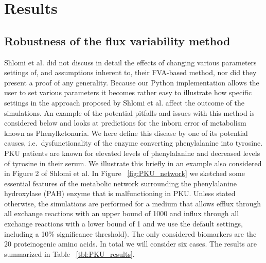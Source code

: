 \documentclass[10pt,a4paper,onecolumn]{article}
\begin{document}
\section{Results}\label{results}

\subsection{Robustness of the flux variability
method}\label{robustness-of-the-flux-variability-method}

Shlomi et al. did not discuss in detail the effects of changing various
parameters settings of, and assumptions inherent to, their FVA-based
method, nor did they present a proof of any generality. Because our
Python implementation allows the user to set various parameters it
becomes rather easy to illustrate how specific settings in the approach
proposed by Shlomi et al. affect the outcome of the simulations. An
example of the potential pitfalls and issues with this method is
considered below and looks at predictions for the inborn error of
metabolism known as Phenylketonuria. We here define this disease by one
of its potential causes, i.e.~dysfunctionality of the enzyme converting
phenylalanine into tyrosine. PKU patients are known for elevated levels
of phenylalanine and decreased levels of tyrosine in their serum. We
illustrate this briefly in an example also considered in Figure 2 of
Shlomi et al. In Figure ~\ref{fig:PKU_network} we sketched some
essential features of the metabolic network surrounding the
phenylalanine hydroxylase (PAH) enzyme that is malfunctioning in PKU.
Unless stated otherwise, the simulations are performed for a medium that
allows efflux through all exchange reactions with an upper bound of 1000
and influx through all exchange reactions with a lower bound of 1 and we
use the default settings, including a 10\% significance threshold). The
only considered biomarkers are the \(20\) proteinogenic amino acids. In
total we will consider six cases. The results are summarized in Table
~\ref{tbl:PKU_results}.
\end{document}
